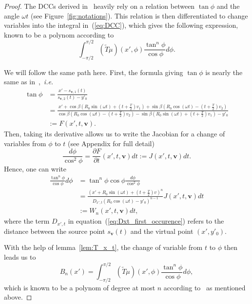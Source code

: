 \documentclass[a4paper]{article}
\numberwithin{equation}{section}
\newcommand{\bv}{\mathbf{v}}
\newcommand{\sbv}{s_{\mathbf{v}}}
\begin{document}
\begin{proof}
The DCCs derived in~\cite{clackdoyle2015consistency} heavily rely on a relation between $\tan \phi$ and the angle $\omega t$ (see Figure~\ref{fig:notations}). This relation is then differentiated to change variables into the integral in~(\ref{eq:DCC}), which gives the following expression, known to be a polynom according to~\cite{clackdoyle2013necessary}
\begin{equation}
	\int_{-\pi/2}^{\pi/2}  \left( \tilde{T}\mu	\right)(x',\phi) \frac{\tan^n \phi}{\cos \phi} d\phi.
\end{equation}

We will follow the same path here. First, the formula giving $\tan \phi$ is nearly the same as in~\cite{clackdoyle2015consistency},~\emph{i.e.}
\begin{align*}
\tan \phi &= \frac{x'-s_{\bv,1}(t)}{s_{\bv,2}(t)-y'_0}\\
&= \frac{x' + \cos \beta \left(R_0 \sin(\omega t) + \left( t + \frac{T}{2} \right)v_1 \right) + \sin \beta \left( R_0 \cos(\omega t) - \left( t + \frac{T}{2} \right) v_2 \right)}{\cos \beta \left( R_0 \cos(\omega t) - \left( t + \frac{T}{2} \right) v_2 \right) - \sin \beta \left(R_0 \sin(\omega t) + \left( t + \frac{T}{2} \right)v_1 \right) - y'_0} \\
&:= F(x',t,\bv).
\end{align*}
Then, taking its derivative allows us to write the Jacobian for a change of variables from $\phi$ to $t$ (see Appendix for full detail)
\begin{equation}
\frac{d\phi}{\cos^2 \phi} = \frac{\partial F}{\partial t}(x',t,\bv)dt := J(x',t,\bv) dt.
\end{equation}
Hence, one can write
\begin{align}
	\frac{\tan^n \phi}{\cos \phi} d\phi &= \tan^n \phi \cos \phi \frac{d\phi}{\cos^2 \phi} \\
	&= \frac{ \left( x'+R_0 \sin(\omega t) + \left( t + \frac{T}{2} \right)v \right)^n }{D_{x',t} \left( R_0 \cos(\omega t) - y'_0 \right)^{n-1}} J(x',t,\bv) dt \label{eq:Dxt_first_occurence} \\
	&:= W_n(x',t,\bv) dt,
\end{align}
where the term $D_{x',t}$ in equation~(\ref{eq:Dxt_first_occurence}) refers to the distance between the source point $\sbv(t)$ and the virtual point $(x',y'_0)$.

With the help of lemma~\ref{lem:T_x_t}, the change of variable from $t$ to $\phi$ then leads us to
\begin{equation}
	B_n(x') = \int_{-\pi/2}^{\pi/2}  \left( \tilde{T}\mu	\right)(x',\phi) \frac{\tan^n \phi}{\cos \phi} d\phi,
\end{equation}
which is known to be a polynom of degree at most $n$ according to~\cite{clackdoyle2013necessary} as mentioned above.
\end{proof}
\end{document}
